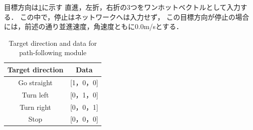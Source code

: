 目標方向は\ref{tab:target}に示す
直進，左折，右折の3つをワンホットベクトルとして入力する．
この中で，停止はネットワークへは入力せず，
この目標方向が停止の場合には，前述の通り並進速度，角速度ともに0.0m/sとする．
\begin{table}[htbp]
    \centering
    \caption{Target direction and data for path-following module}\label{tab:target}
    \begin{tabular}{|c|c|}
    \hline
    Target direction & Data        \\
    \hline
    Go straight   & {[}1，0，0{]} \\
    Turn left   & {[}0，1，0{]} \\
    Turn right   & {[}0，0，1{]} \\
    Stop   & {[}0，0，0{]}\\
    \hline
    \end{tabular}
    \end{table}
